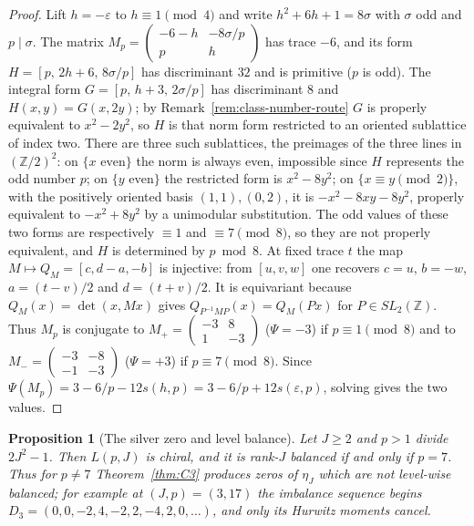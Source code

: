 \documentclass[11pt]{article}
\newtheorem{proposition}[theorem]{Proposition}
\theoremstyle{definition}
\newcommand{\Z}{\mathbb Z}
\begin{document}
\begin{proof}
Lift $h=-\varepsilon$ to $h\equiv1\pmod4$ and write
$h^2+6h+1=8\sigma$ with $\sigma$ odd and $p\mid\sigma$.  The matrix
$M_p=\begin{pmatrix}-6-h&-8\sigma/p\\p&h\end{pmatrix}$ has trace $-6$,
and its form $H=[p,\,2h+6,\,8\sigma/p]$ has discriminant $32$ and is
primitive ($p$ is odd).  The integral form $G=[p,\,h+3,\,2\sigma/p]$ has
discriminant $8$ and $H(x,y)=G(x,2y)$; by Remark~\ref{rem:class-number-route}
$G$ is properly equivalent to $x^2-2y^2$, so $H$ is that norm form
restricted to an oriented sublattice of index two.  There are three such
sublattices, the preimages of the three lines in $(\Z/2)^2$: on
$\{x\text{ even}\}$ the norm is always even, impossible since $H$
represents the odd number $p$; on $\{y\text{ even}\}$ the restricted form is
$x^2-8y^2$; on $\{x\equiv y\pmod2\}$, with the positively oriented basis
$(1,1),(0,2)$, it is $-x^2-8xy-8y^2$, properly equivalent to $-x^2+8y^2$
by a unimodular substitution.  The odd values of these two forms are
respectively $\equiv1$ and $\equiv7\pmod8$, so they are not properly
equivalent, and $H$ is determined by $p\bmod8$.  At fixed trace $t$ the
map $M\mapsto Q_M=[c,d-a,-b]$ is injective: from $[u,v,w]$ one recovers
$c=u$, $b=-w$, $a=(t-v)/2$ and $d=(t+v)/2$.  It is equivariant because
$Q_M(x)=\det(x,Mx)$ gives $Q_{P^{-1}MP}(x)=Q_M(Px)$ for
$P\in SL_2(\Z)$.  Thus $M_p$ is conjugate to
$M_+=\begin{pmatrix}-3&8\\1&-3\end{pmatrix}$ ($\Psi=-3$) if
$p\equiv1\pmod8$ and to $M_-=\begin{pmatrix}-3&-8\\-1&-3\end{pmatrix}$
($\Psi=+3$) if $p\equiv7\pmod8$.  Since
$\Psi(M_p)=3-6/p-12s(h,p)=3-6/p+12s(\varepsilon,p)$, solving gives the
two values.
\end{proof}

\begin{proposition}[The silver zero and level balance]
\label{prop:C3-balance}
Let $J\geq2$ and $p>1$ divide $2J^2-1$.  Then $L(p,J)$ is chiral, and it
is rank-$J$ balanced if and only if $p=7$.  Thus for $p\neq7$
Theorem~\ref{thm:C3} produces zeros of $\eta_J$ which are not level-wise
balanced; for example at $(J,p)=(3,17)$ the imbalance sequence begins
$D_3=(0,0,-2,4,-2,2,-4,2,0,\ldots)$, and only its Hurwitz moments cancel.
\end{proposition}
\end{document}
